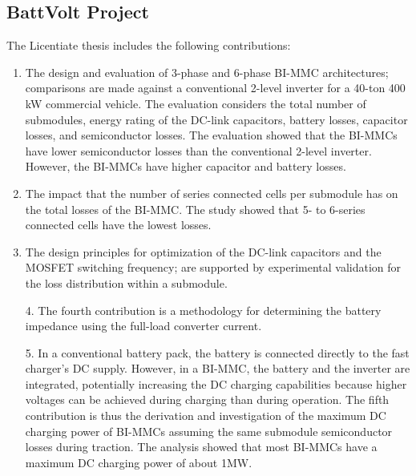 \documentclass{article}
\begin{document}
\subsection{BattVolt Project} 
The Licentiate thesis \cite{balachandran2023battery} includes the following contributions:
\begin{enumerate}
    \item The design and evaluation of 3-phase and 6-phase BI-MMC architectures; comparisons are made against a conventional 2-level inverter for a 40-ton 400 kW commercial vehicle. The evaluation considers the total number of submodules, energy rating of the DC-link capacitors, battery losses, capacitor losses, and semiconductor losses. The evaluation showed that the BI-MMCs have lower semiconductor losses than the conventional 2-level inverter. However, the BI-MMCs have higher capacitor and battery losses. 
    \item The impact that the number of series connected cells per submodule has on the total losses of the BI-MMC. The study showed that 5- to 6-series connected cells have the lowest losses. 
    \item The design principles for optimization of the DC-link capacitors and the MOSFET switching frequency; are supported by experimental validation for the loss distribution within a submodule. 
    \item[4.] The fourth contribution is a methodology for determining the battery impedance using the full-load converter current. 
    \item[5.] In a conventional battery pack, the battery is connected directly to the fast charger's DC supply. However, in a BI-MMC, the battery and the inverter are integrated, potentially increasing the DC charging capabilities because higher voltages can be achieved during charging than during operation. The fifth contribution is thus the derivation and investigation of the maximum DC charging power of BI-MMCs assuming the same submodule semiconductor losses during traction. The analysis showed that most BI-MMCs have a maximum DC charging power of about 1MW.
\end{enumerate}
\end{document}
